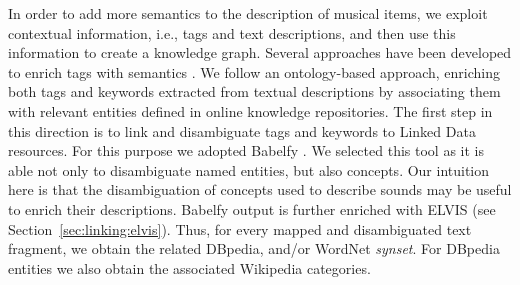 In order to add more semantics to the description of musical items, we exploit contextual information, i.e., tags and text descriptions, %
and then use this information to create a knowledge graph. 
Several approaches have been developed to enrich tags with semantics \citep{Garcia2012}. We follow an ontology-based approach, enriching both tags and keywords extracted from textual descriptions by associating them with relevant entities defined in online knowledge repositories.
The first step in this direction is to link and disambiguate tags and keywords to Linked Data resources. 
For this purpose we adopted Babelfy %
\citep{Moro2014}. We selected this tool as it is able not only to disambiguate named entities, but also concepts. Our intuition here is that the disambiguation of concepts used to describe sounds may be useful to enrich their descriptions. Babelfy output is further enriched with ELVIS (see Section~\ref{sec:linking:elvis}). Thus, for every mapped and disambiguated text fragment, we obtain the related DBpedia, and/or WordNet \textit{synset}. For DBpedia entities we also obtain the associated Wikipedia categories.


